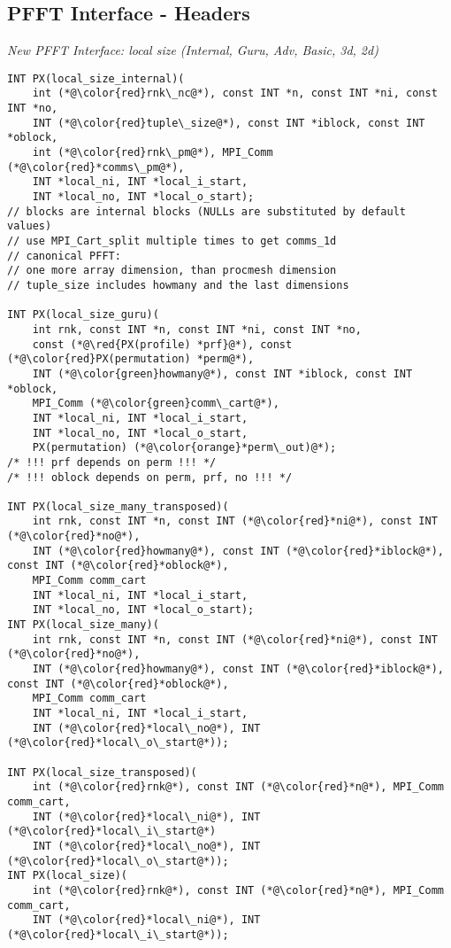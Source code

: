 \newpage
\subsection{PFFT Interface - Headers}
\emph{New PFFT Interface: local size (Internal, Guru, Adv, Basic, 3d, 2d)}
\begin{lstlisting}
INT PX(local_size_internal)(
    int (*@\color{red}rnk\_nc@*), const INT *n, const INT *ni, const INT *no,
    INT (*@\color{red}tuple\_size@*), const INT *iblock, const INT *oblock,
    int (*@\color{red}rnk\_pm@*), MPI_Comm (*@\color{red}*comms\_pm@*),
    INT *local_ni, INT *local_i_start,
    INT *local_no, INT *local_o_start);
// blocks are internal blocks (NULLs are substituted by default values)
// use MPI_Cart_split multiple times to get comms_1d
// canonical PFFT:
// one more array dimension, than procmesh dimension
// tuple_size includes howmany and the last dimensions

INT PX(local_size_guru)(
    int rnk, const INT *n, const INT *ni, const INT *no,
    const (*@\red{PX(profile) *prf}@*), const (*@\color{red}PX(permutation) *perm@*),
    INT (*@\color{green}howmany@*), const INT *iblock, const INT *oblock,
    MPI_Comm (*@\color{green}comm\_cart@*),
    INT *local_ni, INT *local_i_start,
    INT *local_no, INT *local_o_start,
    PX(permutation) (*@\color{orange}*perm\_out)@*);
/* !!! prf depends on perm !!! */
/* !!! oblock depends on perm, prf, no !!! */

INT PX(local_size_many_transposed)(
    int rnk, const INT *n, const INT (*@\color{red}*ni@*), const INT (*@\color{red}*no@*),
    INT (*@\color{red}howmany@*), const INT (*@\color{red}*iblock@*), const INT (*@\color{red}*oblock@*),
    MPI_Comm comm_cart
    INT *local_ni, INT *local_i_start,
    INT *local_no, INT *local_o_start);
INT PX(local_size_many)(
    int rnk, const INT *n, const INT (*@\color{red}*ni@*), const INT (*@\color{red}*no@*),
    INT (*@\color{red}howmany@*), const INT (*@\color{red}*iblock@*), const INT (*@\color{red}*oblock@*),
    MPI_Comm comm_cart
    INT *local_ni, INT *local_i_start,
    INT (*@\color{red}*local\_no@*), INT (*@\color{red}*local\_o\_start@*));

INT PX(local_size_transposed)(
    int (*@\color{red}rnk@*), const INT (*@\color{red}*n@*), MPI_Comm comm_cart,
    INT (*@\color{red}*local\_ni@*), INT (*@\color{red}*local\_i\_start@*)
    INT (*@\color{red}*local\_no@*), INT (*@\color{red}*local\_o\_start@*));
INT PX(local_size)(
    int (*@\color{red}rnk@*), const INT (*@\color{red}*n@*), MPI_Comm comm_cart,
    INT (*@\color{red}*local\_ni@*), INT (*@\color{red}*local\_i\_start@*));


\end{lstlisting}

